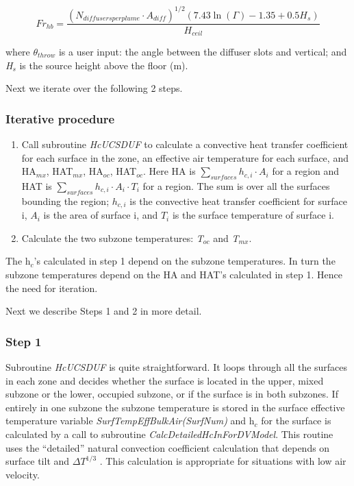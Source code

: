 \begin{equation}
F{r_{hb}} = \frac{{{{({N_{diffusersperplume}}\cdot {A_{diff}})}^{1/2}}(7.43\ln (\Gamma ) - 1.35 + 0.5{H_s})}}{{{H_{ceil}}}}
\end{equation}

where \emph{\(\theta_{throw}\)} is a user input: the angle between the diffuser slots and vertical; and \emph{H\(_{s}\)} is the source height above the floor (m).

Next we iterate over the following 2 steps.

\subsubsection{Iterative procedure}\label{iterative-procedure-1}

\begin{enumerate}
\item Call subroutine \emph{HcUCSDUF} to calculate a convective heat transfer coefficient for each surface in the zone, an effective air temperature for each surface, and HA\(_{mx}\), HAT\(_{mx}\), HA\(_{oc}\), HAT\(_{oc}\). Here HA is \(\sum\limits_{surfaces} {{h_{c,i}} \cdot {A_i}}\) for a region and HAT is \(\sum\limits_{surfaces} {{h_{c,i}} \cdot {A_i}} \cdot {T_i}\) for a region. The sum is over all the surfaces bounding the region; \({{h_{c,i}}}\) is the convective heat transfer coefficient for surface i, \({A_i}\) is the area of surface i, and \({T_i}\) is the surface temperature of surface i.
\item Calculate the two subzone temperatures: \emph{T\(_{oc}\)} and \emph{T\(_{mx}\)}.
\end{enumerate}

The h\(_{c}\)'s calculated in step 1 depend on the subzone temperatures. In turn the subzone temperatures depend on the HA and HAT's calculated in step 1. Hence the need for iteration.

Next we describe Steps 1 and 2 in more detail.

\subsubsection{Step 1}\label{step-1-1}

Subroutine \emph{HcUCSDUF} is quite straightforward. It loops through all the surfaces in each zone and decides whether the surface is located in the upper, mixed subzone or the lower, occupied subzone, or if the surface is in both subzones. If entirely in one subzone the subzone temperature is stored in the surface effective temperature variable \emph{SurfTempEffBulkAir(SurfNum)} and h\(_{c}\) for the surface is calculated by a call to subroutine \emph{CalcDetailedHcInForDVModel}. This routine uses the ``detailed'' natural convection coefficient calculation that depends on surface tilt and \(\Delta {T^{1/3}}\) . This calculation is appropriate for situations with low air velocity.

